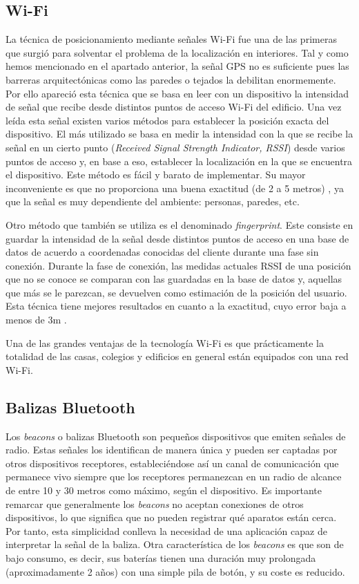 \subsection{Wi-Fi}

La técnica de posicionamiento mediante señales Wi-Fi fue una de las primeras que surgió para solventar el problema de la localización en interiores. Tal y como hemos mencionado en el apartado anterior, la señal GPS no es suficiente pues las barreras arquitectónicas como las paredes o tejados la debilitan enormemente. Por ello apareció esta técnica que se basa en leer con un dispositivo la intensidad de señal que recibe desde distintos puntos de acceso Wi-Fi del edificio. Una vez leída esta señal existen varios métodos para establecer la posición exacta del dispositivo. El más utilizado se basa en medir la intensidad con la que se recibe la señal en un cierto punto (\textit{Received Signal Strength Indicator, RSSI}) desde varios puntos de acceso y, en base a eso, establecer la localización en la que se encuentra el dispositivo. Este método es fácil y barato de implementar. Su mayor inconveniente es que no proporciona una buena exactitud (de 2 a 5 metros) \citep{wifipositioning}, ya que la señal es muy dependiente del ambiente: personas, paredes, etc.

Otro método que también se utiliza es el denominado \textit{fingerprint}. Este consiste en guardar la intensidad de la señal desde distintos puntos de acceso en una base de datos de acuerdo a coordenadas conocidas del cliente durante una fase sin conexión. Durante la fase de conexión, las medidas actuales RSSI de una posición que no se conoce se comparan con las guardadas en la base de datos y, aquellas que más se le parezcan, se devuelven como estimación de la posición del usuario. Esta técnica tiene mejores resultados en cuanto a la exactitud, cuyo error baja a menos de 3m \citep{wifipositioning}. 

Una de las grandes ventajas de la tecnología Wi-Fi es que prácticamente la totalidad de las casas, colegios y edificios en general están equipados con una red Wi-Fi.


\subsection{Balizas Bluetooth}

Los \textit{beacons} o balizas Bluetooth son pequeños dispositivos que emiten señales de radio. Estas señales los identifican de manera única y pueden ser captadas por otros dispositivos receptores, estableciéndose así un canal de comunicación que permanece vivo siempre que los receptores permanezcan en un radio de alcance de entre 10 y 30 metros como máximo, según el dispositivo. Es importante remarcar que generalmente los \textit{beacons} no aceptan conexiones de otros dispositivos, lo que significa que no pueden registrar qué aparatos están cerca. Por tanto, esta simplicidad conlleva la necesidad de una aplicación capaz de interpretar la señal de la baliza. Otra característica de los \textit{beacons} es que son de bajo consumo, es decir, sus baterías tienen una duración muy prolongada (aproximadamente 2 años) con una simple pila de botón, y su coste es reducido.

